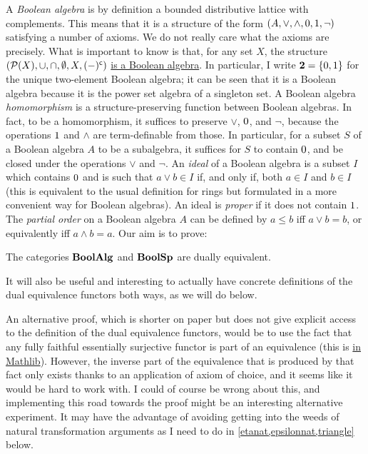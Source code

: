 \documentclass[a4paper,10pt]{article}
\numberwithin{theorem}{section}
\begin{document}
A \emph{Boolean algebra} is by definition a bounded distributive lattice with
complements. This means that it is a structure of the form $(A, \vee, \wedge,
0, 1, \neg)$ satisfying a number of axioms. We do not really care what
the axioms are precisely. What is important to know is that, for any set $X$,
the structure $(\mathcal{P}(X), \cup, \cap, \emptyset, X, (-)^{\mathsf{c}})$
\href{https://leanprover-community.github.io/mathlib4_docs/Mathlib/Data/Set/Basic.html#Set.instBooleanAlgebraSet}{is
a Boolean algebra}. In particular, I write $\mathbf{2} = \{ 0, 1 \}$ for the
unique two-element Boolean algebra; it can be seen that it is a Boolean algebra
because it is the power set algebra of a singleton set. A Boolean algebra
\emph{homomorphism} is a structure-preserving function between Boolean
algebras. In fact, to be a homomorphism, it suffices to preserve $\vee$,
$0$, and $\neg$, because the operations $1$ and $\wedge$ are
term-definable from those. In particular, for a subset $S$ of a Boolean algebra
$A$ to be a subalgebra, it suffices for $S$ to contain $0$, and be closed
under the operations $\vee$ and $\neg$. An \emph{ideal} of a Boolean algebra is
a subset $I$ which contains $0$ and is such that $a \vee b \in I$ if, and
only if, both $a \in I$ and $b \in I$ (this is equivalent to the usual
definition for rings but formulated in a more convenient way for Boolean
algebras). An ideal is \emph{proper} if it does not contain $1$. The
\emph{partial order} on a Boolean algebra $A$ can be defined by $a \leq b$ iff
$a \vee b = b$, or equivalently  iff $a \wedge b = a$. Our aim is to prove:
\begin{theorem}\label{BABoolSpdualeq} The categories $\mathbf{BoolAlg}$ and $\mathbf{BoolSp}$
    are dually equivalent.
\end{theorem}
It will also be useful and interesting to actually have concrete definitions of
the dual equivalence functors both ways, as we will do below. 
\begin{remark}
An alternative proof, which is shorter on paper but does not give explicit access
to the definition of the dual equivalence functors, would be to use the
fact that any fully faithful essentially surjective functor is part
of an equivalence (this is  
\href{https://leanprover-community.github.io/mathlib4_docs/Mathlib/CategoryTheory/Equivalence.html#CategoryTheory.Equivalence.ofFullyFaithfullyEssSurj}{
in Mathlib}). However, the inverse part of the equivalence that is
produced by that fact only exists thanks to an application of axiom of choice, and it
seems like it would be hard to work with. I could of course be wrong about this, and
implementing this road towards the proof might be an interesting alternative experiment. It
may have the advantage of avoiding getting into the weeds of natural
transformation arguments as I need to do in \cref{etanat,epsilonnat,triangle} below.
\end{remark}
\end{document}

